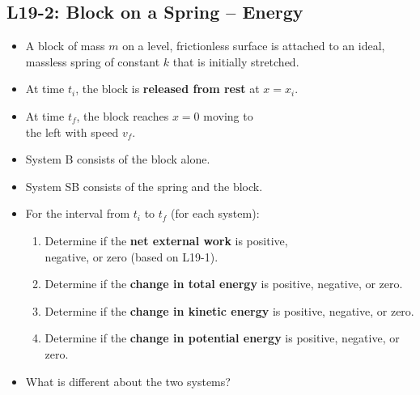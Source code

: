 \documentclass[]{article}
\newcommand{\Week}{19}
\begin{document}
\begin{PresentSpace}
\vspace{-10pt}
\section*{L\Week-2: Block on a Spring -- Energy}
\vspace{-10pt}
\begin{itemize}
	\large
	\item A block of mass $m$ on a level, frictionless surface is attached to an ideal, massless spring of constant $k$ that is initially stretched.
	\item At time $t_{i}$, the block is \textbf{released from rest} at $x=x_{i}$.
	\item At time $t_{f}$, the block reaches $x=0$ moving to \\
	the left with speed $v_{f}$.
	\item System B consists of the block alone.
	\item System SB consists of the spring and the block.
	\item For the interval from $t_{i}$ to $t_{f}$ (for each system):
	\begin{enumerate}[(1)]
		\normalsize
		\item Determine if the \textbf{net external work} is positive, \\
		negative, or zero (based on L19-1).
		\item Determine if the \textbf{change in total energy} is positive, negative, or zero.
		\item Determine if the \textbf{change in kinetic energy} is positive, negative, or zero.
		\item Determine if the \textbf{change in potential energy} is positive, negative, or zero.
	\end{enumerate}
	\item What is different about the two systems?
\end{itemize}
\end{PresentSpace}
\end{document}
